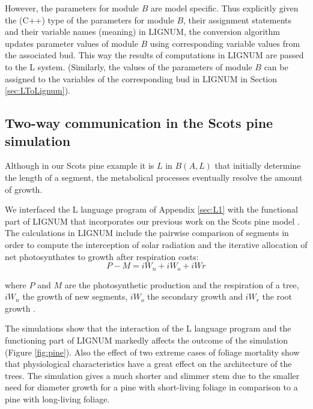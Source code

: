 However,  the parameters  for  module $B$  are  model specific.   Thus
explicitly  given the  (C++) type  of the  parameters for  module $B$,
their  assignment statements  and  their variable  names (meaning)  in
LIGNUM, the  conversion algorithm  updates parameter values  of module
$B$ using corresponding variable values from the associated bud.  This
way the results of computations in  LIGNUM are passed to the L system.
(Similarly, the values of the parameters of module $B$ can be assigned
to  the  variables of  the  corresponding  bud  in LIGNUM  in  Section
\ref{sec:LToLignum}).

\subsection{Two-way communication in the Scots pine simulation}

Although  in  our  Scots pine  example  it  is  $L$ in  $B(A,L)$  that
initially determine the length of a segment, the metabolical processes
eventually resolve the amount of growth.
  
We interfaced the L language program of Appendix \ref{sec:L1} with the
functional part of  LIGNUM that incorporates our previous  work on the
Scots pine model \citep{perttunen:96, perttunen:98}.  The calculations
in  LIGNUM include  the pairwise  comparison of  segments in  order to
compute  the  interception  of   solar  radiation  and  the  iterative
allocation of  net photosynthates  to growth after  respiration costs:
\begin{equation} P - M = iW_n + iW_o + iWr \end{equation}

where  $P$   and  $M$  are  the  photosynthetic   production  and  the
respiration of a  tree, $iW_n$ the growth of  new segments, $iW_o$ the
secondary      growth     and      $iW_r$     the      root     growth
\citep[c.f.][]{perttunen:96,perttunen:01}.

The simulations  show that the  interaction of the L  language program
and the functioning part of LIGNUM markedly affects the outcome of the
simulation (Figure  \ref{fig:pine}).  Also  the effect of  two extreme
cases  of foliage  mortality show  that  physiological characteristics
have a great effect on  the architecture of the trees.  The simulation
gives a  much shorter  and slimmer  stem due to  the smaller  need for
diameter growth for a pine  with short-living foliage in comparison to
a pine with long-living foliage.

